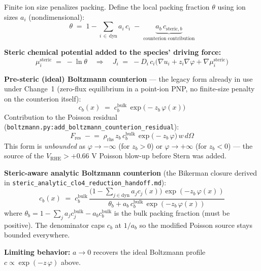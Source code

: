 \documentclass[11pt]{article}
\newcommand{\VRHE}{V_{\mathrm{RHE}}}
\begin{document}
\begin{tcolorbox}[cardstyle={Bikerman steric correction}]
Finite ion size penalizes packing. Define the local packing fraction
\(\theta\) using ion sizes \(a_i\) (nondimensional):
\[
  \theta \;=\; 1 - \sum_{i\,\in\,\text{dyn}}\!a_i\,c_i
   \;-\;\underbrace{a_b\,c_{\mathrm{steric},b}}_{\text{counterion contribution}}
\]

\textbf{Steric chemical potential added to the species' driving force:}
\[
  \mu_i^{\mathrm{steric}} \;=\; -\ln\theta
  \quad\Longrightarrow\quad
  J_i \;=\; -D_i\,c_i\bigl(\nabla u_i + z_i\nabla\varphi
                            + \nabla\mu_i^{\mathrm{steric}}\bigr)
\]

\textbf{Pre-steric (ideal) Boltzmann counterion} --- the legacy form
already in use under Change~1 (zero-flux equilibrium in a point-ion
PNP, no finite-size penalty on the counterion itself):
\[
  c_b(x) \;=\; c_b^{\mathrm{bulk}}\,\exp\!\bigl(-z_b\,\varphi(x)\bigr)
\]
Contribution to the Poisson residual
(\texttt{boltzmann.py:add\_boltzmann\_counterion\_residual}):
\[
  F_{\mathrm{res}} \;\mathrel{-}=\;
   \rho_{\mathrm{rhs}}\,z_b\,c_b^{\mathrm{bulk}}\,
   \exp\!\bigl(-z_b\,\varphi\bigr)\,w\,d\Omega
\]
This form is \emph{unbounded} as \(\varphi\to-\infty\) (for \(z_b>0\))
or \(\varphi\to+\infty\) (for \(z_b<0\)) --- the source of the
\(\VRHE>+0.66\) V Poisson blow-up before Stern was added.

\textbf{Steric-aware analytic Boltzmann counterion} (the Bikerman
closure derived in
\texttt{steric\_analytic\_clo4\_reduction\_handoff.md}):
\[
  c_b(x) \;=\;
   c_b^{\mathrm{bulk}}\,
   \frac{\bigl(1 - \sum_{j\in\mathrm{dyn}} a_j c_j(x)\bigr)\,
         \exp(-z_b\,\varphi(x))}
        {\theta_b + a_b\,c_b^{\mathrm{bulk}}\,\exp(-z_b\,\varphi(x))}
\]
where \(\theta_b = 1 - \sum_j a_j c_j^{\mathrm{bulk}} - a_b c_b^{\mathrm{bulk}}\)
is the bulk packing fraction (must be positive). The denominator
caps \(c_b\) at \(1/a_b\) so the modified Poisson source stays
bounded everywhere.

\textbf{Limiting behavior:} \(a\to 0\) recovers the ideal Boltzmann
profile \(c \propto \exp(-z\,\varphi)\) above.
\end{tcolorbox}
\end{document}

